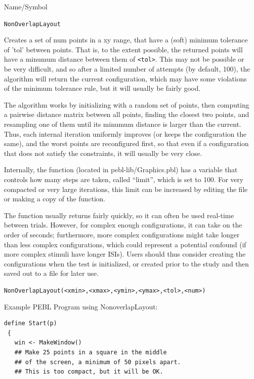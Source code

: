 \begin{desc}{Name/Symbol}
   
\item[Name/Symbol] \verb+NonOverlapLayout+

\item[Description]        Creates a set of num points in a xy range, that have a (soft) minimum tolerance of 'tol' between points.  That is, to the extent possible, the returned points will have a minumum distance between them of \verb+<tol>+.  This may not be possible or be very difficult, and so after a limited number of attempts (by default, 100), the algorithm will return the current configuration, which may have some violations of the minimum tolerance rule, but it will usually be fairly good.  

The algorithm works by initializing with a random set of points, then computing a pairwise distance matrix between all points, finding the closest two points, and resampling one of them until its minumum distance is larger than the current.  Thus, each internal iteration uniformly improves (or keeps the configuration the same), and the worst points are reconfigured first, so that even if a configuration that does not satisfy the constraints, it will usually be very close.

Internally, the function (located in pebl-lib/Graphics.pbl) has a variable that controls how many steps are taken, called ``limit'', which is set to 100.  For very compacted or very large iterations, this limit can be increased by editing the file or making a copy of the function.  

The function usually returns fairly quickly, so it can often be used real-time between trials.  However, for complex enough configurations, it can take on the order of seconds; furthermore, more  complex configurations might take longer than less complex configurations, which could represent a potential confound (if more complex stimuli have longer ISIs).  Users should thus consider creating the configurations when the test is initialized, or created prior to the study and then saved out to a file for later use.


\newpage

\item[Usage]       
\verb+NonOverlapLayout(<xmin>,<xmax>,<ymin>,<ymax>,<tol>,<num>)+

\item[Example]

Example PEBL Program using NonoverlapLayout:
\begin{verbatim}
define Start(p)
 {
   win <- MakeWindow()  
   ## Make 25 points in a square in the middle 
   ## of the screen, a minimum of 50 pixels apart.  
   ## This is too compact, but it will be OK.


\end{verbatim}
\end{desc}
